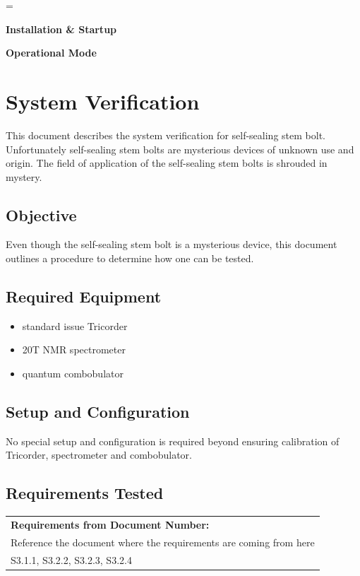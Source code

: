 \documentclass[a4paper,12pt]{article}
\theoremstyle{definition}
\newenvironment{subtheorems}{%
  \savedtheorem=\value{theorem}%
  \edef\prevthetheorem{\thetheorem}%
  \setcounter{theorem}{0}%
  \renewcommand\thetheorem{\prevthetheorem.\arabic{theorem}}%
}
{%
  \setcounter{theorem}{\savedtheorem}%
}
\def\arraystretch{1.5}%
\begin{document}
\begin{subtheorems}

	\noindent\textbf{\large{Installation \& Startup}}


	\noindent\textbf{\large{Operational Mode}}


\end{subtheorems}




\section{System Verification}
This document describes the system verification for self-sealing stem bolt. Unfortunately self-sealing stem bolts are mysterious devices of unknown use and origin. The field of application of the self-sealing stem bolts is shrouded in mystery.

\subsection{Objective}

Even though the self-sealing stem bolt is a mysterious device, this document outlines a procedure to determine how one can be tested.

\subsection{Required Equipment}

\begin{itemize}
	\item standard issue Tricorder
	\item 20T NMR spectrometer
	\item quantum combobulator
\end{itemize}



\subsection{Setup and Configuration}

No special setup and configuration is required beyond ensuring calibration of Tricorder, spectrometer and combobulator.

\subsection{Requirements Tested}


\bgroup
\def\arraystretch{1.5}%
\begin{tabularx}{\textwidth}{|X|}
	\hline
	\textbf{Requirements from Document Number:} \\ Reference the document where the requirements are coming from here \\ \hline
	S3.1.1, S3.2.2, S3.2.3, S3.2.4              \\ \hline
\end{tabularx}
\egroup
\end{document}
